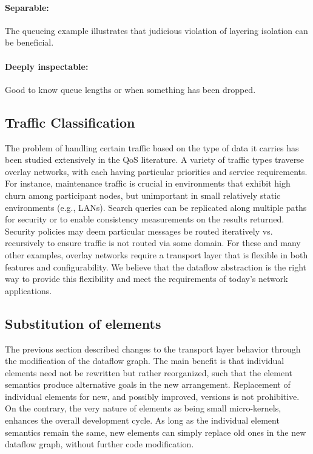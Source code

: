 \paragraph{Separable:} The queueing example illustrates that
judicious violation of layering isolation can be beneficial.

\paragraph{Deeply inspectable:} Good to know queue
lengths or when something has been dropped.



\subsection{Traffic Classification}

The problem of handling certain traffic based on the type of data it carries has been
studied extensively in the QoS literature. A variety of traffic types traverse overlay
networks, with each having particular priorities and service requirements. For instance, maintenance traffic is crucial in environments that exhibit high churn among participant
nodes, but unimportant in small relatively static environments (e.g., LANs). Search
queries can be replicated along multiple paths for security or to enable consistency
measurements on the results returned. Security policies may deem
particular messages be routed iteratively vs. recursively to ensure traffic is not routed 
via some domain. For these and many other examples, overlay networks require a 
transport layer that is flexible in both features and configurability. We believe that the 
dataflow abstraction is the right way to provide this flexibility and meet the requirements 
of today's network applications.



\subsection{Substitution of elements}
\label{sec:substitution}
The previous section described changes to the transport layer behavior through
the modification of the dataflow graph. The main benefit is that individual elements
need not be rewritten but rather reorganized, such that the element semantics 
produce alternative goals in the new arrangement. Replacement of individual
elements for new, and possibly improved, versions is not prohibitive. On the contrary, 
the very nature of elements as being small micro-kernels, enhances the overall development cycle. As long as the individual element semantics remain the same, 
new elements can simply replace old ones in the new dataflow graph, without further
code modification. 


